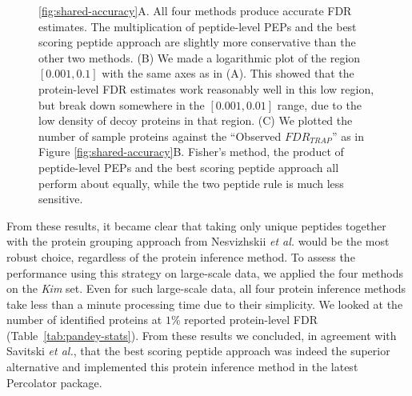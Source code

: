 \documentclass{article}
\begin{document}
\begin{figure}[!htp]
\begin{center}
{\ref{fig:shared-accuracy}A. All four methods produce
accurate FDR estimates. The multiplication of peptide-level PEPs and
the best scoring peptide approach are slightly more conservative than
the other two methods. (B) We made a logarithmic plot of the region
$[0.001, 0.1]$ with the same axes as in (A). This showed that the
protein-level FDR estimates work reasonably well in this low region,
but break down somewhere in the $[0.001, 0.01]$ range, due to the low
density of decoy proteins in that region. (C) We plotted the number of
sample proteins against the ``Observed $FDR_{TRAP}$'' as in Figure
\ref{fig:shared-accuracy}B. Fisher's method, the product of
peptide-level PEPs and the best scoring peptide approach all perform
about equally, while the two peptide rule is much less sensitive.}
\end{center}
\end{figure}

From these results, it became clear that taking only unique peptides
together with the protein grouping approach from Nesvizhskii {\em et
al.} would be the most robust choice, regardless of the protein
inference method. To assess the performance using this strategy on
large-scale data, we applied the four methods on the {\em Kim} set.
Even for such large-scale data, all four protein inference methods
take less than a minute processing time due to their simplicity. We
looked at the number of identified proteins at $1\%$ reported
protein-level FDR (Table~\ref{tab:pandey-stats}). From these results
we concluded, in agreement with Savitski {\em et al.}, that the best
scoring peptide approach was indeed the superior alternative and
implemented this protein inference method in the latest Percolator
package. 
\end{document}
